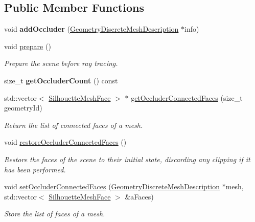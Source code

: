 \subsection*{Public Member Functions}
\begin{DoxyCompactItemize}
\item 
\mbox{\label{classvisilib_1_1_geometry_occluder_set_a4df1bd4ead51c3540ab3f83b508e116f}} 
void {\bfseries add\+Occluder} (\mbox{\hyperlink{structvisilib_1_1_geometry_discrete_mesh_description}{Geometry\+Discrete\+Mesh\+Description}} $\ast$info)
\item 
\mbox{\label{classvisilib_1_1_geometry_occluder_set_a9ad0f12014c07ed08cdd6be981faf704}} 
void \mbox{\hyperlink{classvisilib_1_1_geometry_occluder_set_a9ad0f12014c07ed08cdd6be981faf704}{prepare}} ()
\begin{DoxyCompactList}\small\item\em Prepare the scene before ray tracing. \end{DoxyCompactList}\item 
\mbox{\label{classvisilib_1_1_geometry_occluder_set_a6b4c7066a4ef012501748501f3d2febc}} 
size\+\_\+t {\bfseries get\+Occluder\+Count} () const
\item 
std\+::vector$<$ \mbox{\hyperlink{classvisilib_1_1_silhouette_mesh_face}{Silhouette\+Mesh\+Face}} $>$ $\ast$ \mbox{\hyperlink{classvisilib_1_1_geometry_occluder_set_a48bcbc4a98511777faf8fa006343d6a3}{get\+Occluder\+Connected\+Faces}} (size\+\_\+t geometry\+Id)
\begin{DoxyCompactList}\small\item\em Return the list of connected faces of a mesh. \end{DoxyCompactList}\item 
\mbox{\label{classvisilib_1_1_geometry_occluder_set_a01d2de1cfec62e4000ca3b5b262ae4bb}} 
void \mbox{\hyperlink{classvisilib_1_1_geometry_occluder_set_a01d2de1cfec62e4000ca3b5b262ae4bb}{restore\+Occluder\+Connected\+Faces}} ()
\begin{DoxyCompactList}\small\item\em Restore the faces of the scene to their initial state, discarding any clipping if it has been performed. \end{DoxyCompactList}\item 
void \mbox{\hyperlink{classvisilib_1_1_geometry_occluder_set_a64be17502b1343e735a4385edeaf223f}{set\+Occluder\+Connected\+Faces}} (\mbox{\hyperlink{structvisilib_1_1_geometry_discrete_mesh_description}{Geometry\+Discrete\+Mesh\+Description}} $\ast$mesh, std\+::vector$<$ \mbox{\hyperlink{classvisilib_1_1_silhouette_mesh_face}{Silhouette\+Mesh\+Face}} $>$ \&a\+Faces)
\begin{DoxyCompactList}\small\item\em Store the list of faces of a mesh. \end{DoxyCompactList}\end{DoxyCompactItemize}
